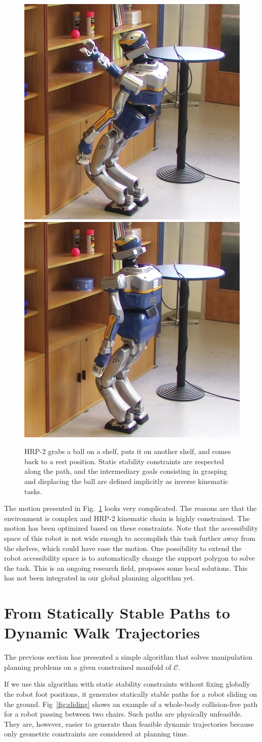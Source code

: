 \documentclass{article}
\begin{document}
\begin{figure}[h]
\includegraphics[width=0.24\linewidth]{pics/wb-shelves/7.jpg}
\includegraphics[width=0.24\linewidth]{pics/wb-shelves/8.jpg}



\caption{HRP-2 grabs a ball on a shelf, puts it on another shelf, and comes back to 
  a rest position. Static stability constraints are respected along the path, and 
  the intermediary goals consisting in grasping and displacing the ball are defined
  implicitly as inverse kinematic tasks.}
\label{fig:wb-shelves}
\end{figure}



The motion presented in Fig.~\ref{fig:wb-shelves} looks very complicated.
The reasons are that the environment is complex and HRP-2 kinematic chain is highly constrained.
The motion has been optimized based on these constraints. Note that the
accessibility space of this robot is not wide enough to accomplish this task further 
away from the shelves, which could have ease the motion. One possibility to extend the
robot accessibility space is to automatically change the support polygon to solve the task.
This is an ongoing research field, \cite{OussamaKanoun06102010} proposes some 
local solutions. This has not been integrated in our global planning algorithm yet.



\section{From Statically Stable Paths to Dynamic Walk Trajectories}
\label{sec:wb-step}

The previous section has presented a simple algorithm that solves manipulation planning
problems on a given constrained manifold of $\mathcal{C}$. 

If we use this algorithm with static 
stability constraints without fixing globally the robot foot positions, it generates 
statically stable paths for a robot sliding on the ground. Fig~\ref{fig:sliding} shows
an example of a whole-body collision-free path for a robot passing between two chairs.
Such paths are physically unfeasible. They are, however, easier to generate than feasible
dynamic trajectories because only geometric constraints are considered at planning time.
\end{document}
